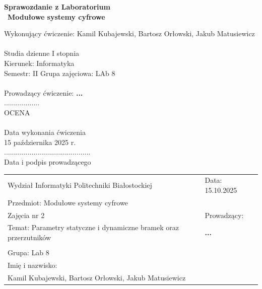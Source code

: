 \documentclass{article}
\begin{document}
	\begin{center}
	
	\textbf{Sprawozdanie z Laboratorium} \\
	\vspace{0.1cm}\
	\textbf{Modułowe systemy cyfrowe}
	\vspace{0.1cm}\
	\end{center}	

\noindent Wykonujący ćwiczenie: Kamil Kubajewski, Bartosz Orłowski, Jakub Matusiewicz \\
\vspace{3cm} \\
Studia dzienne I stopnia \\
Kierunek: Informatyka \\
Semestr: II \hspace{4cm} Grupa zajęciowa: LAb 8 \\
\\
Prowadzący ćwiczenie: \textbf{...} \\
\phantom{a} \hfill .................. \\
\phantom{a} \hfill OCENA \\
\\ 
\vfill \noindent
Data wykonania ćwiczenia \\
15 października 2025 r.\ \\
\phantom{a} \hfill ............................................\\
\phantom{a} \hfill Data i podpis prowadzącego

\pagebreak
\begin{center}
    \hspace{-1.2cm}
    \begin{tabular}{|p{}|l|}
        \hline
        Wydział Informatyki Politechniki Białostockiej \hfill & Data: 15.10.2025 \\
        Przedmiot: Modułowe systemy cyfrowe \hfill & \\
        \hline
        Zajęcia nr 2 & Prowadzący: \\
        Temat: Parametry statyczne i dynamiczne bramek oraz przerzutników & \textbf{...}\phantom{Phantom Phantomphantom} \\
        & \\
        Grupa: Lab 8 & \\
        Imię i nazwisko: & \\
        Kamil Kubajewski, Bartosz Orłowski, Jakub Matusiewicz & \\
        \hline
    \end{tabular}
\end{center}
\end{document}
